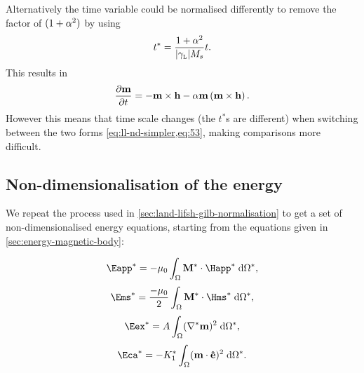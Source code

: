 Alternatively the time variable could be normalised differently to remove the factor of $(1 + \alpha^2)$ by using
\begin{equation}
  t^* = \frac{1 + \alpha^2}{{\left|{\gamma_{\text{\tiny{L}}}} \right|} M_s} t.
\end{equation}
This results in
\begin{equation}
  \frac{\partial \mathbf{m}}{\partial t} = -\mathbf{m} \times \mathbf{h} -\alpha \mathbf{m} \left(\mathbf{m} \times \mathbf{h} \right).
  \label{eq:ll-nd-simpler}
\end{equation}
However this means that time scale changes (\ie the $t^*$s are different) when switching between the two forms \cref{eq:ll-nd-simpler,eq:53}, making comparisons more difficult.


\subsection{Non-dimensionalisation of the energy}
\label{sec:energy-calculations}

We repeat the process used in \cref{sec:land-lifsh-gilb-normalisation} to get a set of non-dimensionalised energy equations, starting from the equations given in \cref{sec:energy-magnetic-body}:

\begin{equation}
  \Eapp^* = - \mu_0 \int_{\magd} \Mv^* \cdot \Happ^* \d \magd^*,
\end{equation}
\begin{equation}
  \Ems^* =  \frac{-\mu_0}{2} \int_{\magd} \Mv^* \cdot \Hms^* \d \magd^*,
\end{equation}
\begin{equation}
  \Eex^* =  \Exchc \int_{\magd} (\nabla^* \mv)^2 \d \magd^*,
\end{equation}
\begin{equation}
  \Eca^* =  -\Kone^* \int_\magd (\mv \cdot \ev)^2 \d \magd^*.
\end{equation}


